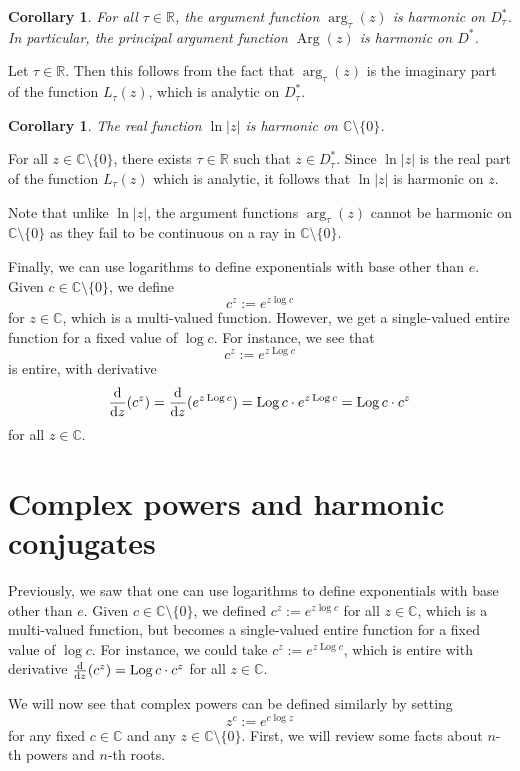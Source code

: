 \documentclass[10pt]{article}
\makeatletter
\newcommand{\R}{\mathbb{R}}
\newcommand{\C}{\mathbb{C}}
\newcommand{\ddz}{\frac{\rm d}{{\rm d}z}}
\DeclareMathOperator{\Arg}{Arg}
\DeclareMathOperator{\Log}{Log}
\theoremstyle{newstyle}
\newtheorem{cor}[thm]{Corollary}
\newenvironment{pf}[1][\proofname]{\par
  \pushQED{\qed}%
  \normalfont \topsep0\p@\relax
  \trivlist
  \item[\hskip\labelsep\scshape
  #1\@addpunct{.}]\ignorespaces
}{%
  \popQED\endtrivlist\@endpefalse
}
\makeatother
\begin{document}
\begin{cor}
For all $\tau \in \R$, the argument function $\arg_\tau(z)$ is harmonic on $D_\tau^*$. 
In particular, the principal argument function $\Arg(z)$ is harmonic on $D^*$. 
\end{cor}
\begin{pf}
Let $\tau \in \R$. Then this follows from the fact that $\arg_\tau(z)$ is the imaginary part of the function 
$L_\tau(z)$, which is analytic on $D_\tau^*$. 
\end{pf}

\begin{cor}
The real function $\ln|z|$ is harmonic on $\C \setminus \{0\}$. 
\end{cor}
\begin{pf}
For all $z \in \C \setminus \{0\}$, there exists $\tau \in \R$ such that 
$z \in D_\tau^*$. Since $\ln|z|$ is the real part of the function $L_\tau(z)$ which is 
analytic, it follows that $\ln|z|$ is harmonic on $z$. 
\end{pf}

Note that unlike $\ln|z|$, the argument functions $\arg_\tau(z)$ cannot be harmonic on 
$\C \setminus \{0\}$ as they fail to be continuous on a ray in $\C \setminus \{0\}$. 

Finally, we can use logarithms to define exponentials with base other than $e$. 
Given $c \in \C \setminus \{0\}$, we define 
\[ c^z := e^{z\log c} \]
for $z \in \C$, which is a multi-valued function. However, we get a single-valued entire function 
for a fixed value of $\log c$. For instance, we see that 
\[ c^z := e^{z \Log c} \]
is entire, with derivative 
\[ \frac{\rm d}{{\rm d}z} (c^z) = \frac{\rm d}{{\rm d}z} (e^{z \Log c}) 
= \Log c \cdot e^{z \Log c} = \Log c \cdot c^z \]
for all $z \in \C$. 

\newpage 
\section{Complex powers and harmonic conjugates}

Previously, we saw that one can use logarithms to define exponentials with base other than $e$.
Given $c \in \C \setminus \{0\}$, we defined $c^z := e^{z\log c}$ for all $z \in \C$, which 
is a multi-valued function, but becomes a single-valued entire function for a fixed value of 
$\log c$. For instance, we could take $c^z := e^{z \Log c}$, which is entire with derivative 
$\ddz(c^z) = \Log c \cdot c^z$
for all $z \in \C$. 

We will now see that complex powers can be defined similarly by setting 
\[ z^c := e^{c\log z} \] 
for any fixed $c \in \C$ and any $z \in \C \setminus \{0\}$. First, we will review some facts 
about $n$-th powers and $n$-th roots. 
\end{document}
